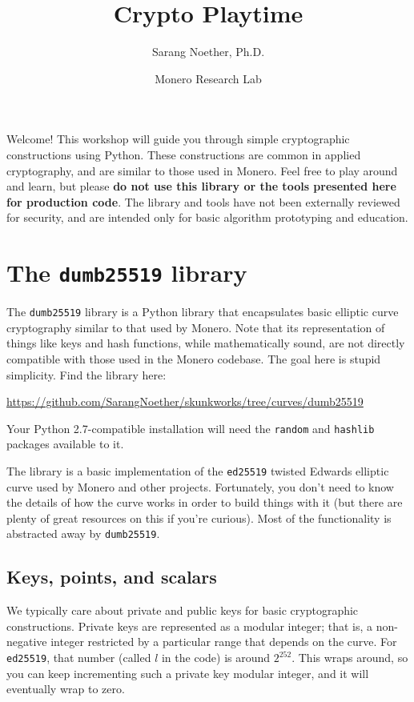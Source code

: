 \documentclass{article}
\title{Crypto Playtime}
\author{Sarang Noether, Ph.D.}
\date{Monero Research Lab}
\begin{document}
\maketitle

Welcome! This workshop will guide you through simple cryptographic constructions using Python. These constructions are common in applied cryptography, and are similar to those used in Monero. Feel free to play around and learn, but please \textbf{do not use this library or the tools presented here for production code}. The library and tools have not been externally reviewed for security, and are intended only for basic algorithm prototyping and education.

\section{The \texttt{dumb25519} library}
The \texttt{dumb25519} library is a Python library that encapsulates basic elliptic curve cryptography similar to that used by Monero. Note that its representation of things like keys and hash functions, while mathematically sound, are not directly compatible with those used in the Monero codebase. The goal here is stupid simplicity. Find the library here:
\begin{center}
\url{https://github.com/SarangNoether/skunkworks/tree/curves/dumb25519}
\end{center}
Your Python 2.7-compatible installation will need the \texttt{random} and \texttt{hashlib} packages available to it.

The library is a basic implementation of the \texttt{ed25519} twisted Edwards elliptic curve used by Monero and other projects. Fortunately, you don't need to know the details of how the curve works in order to build things with it (but there are plenty of great resources on this if you're curious). Most of the functionality is abstracted away by \texttt{dumb25519}.

\subsection{Keys, points, and scalars}
We typically care about private and public keys for basic cryptographic constructions. Private keys are represented as a modular integer; that is, a non-negative integer restricted by a particular range that depends on the curve. For \texttt{ed25519}, that number (called $l$ in the code) is around $2^{252}$. This wraps around, so you can keep incrementing such a private key modular integer, and it will eventually wrap to zero.
\end{document}
